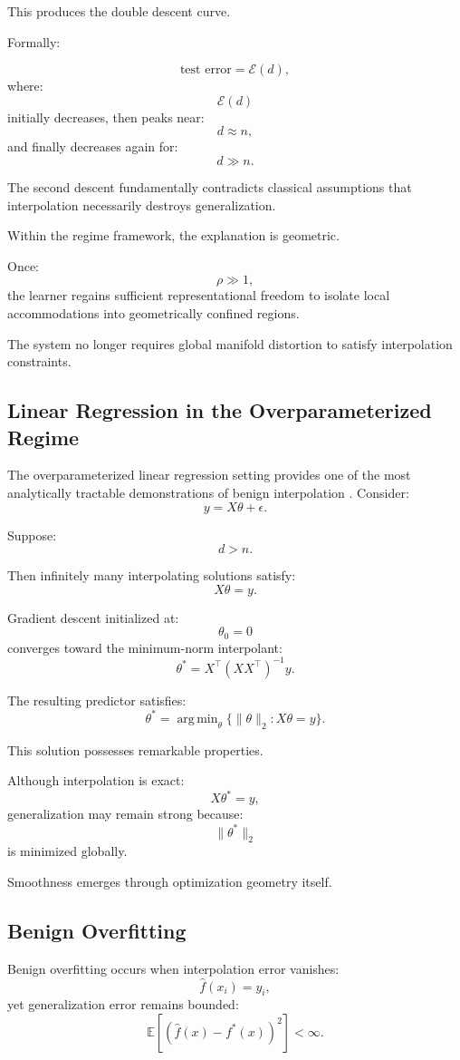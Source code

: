 \documentclass[12pt,a4paper]{article}
\DeclareMathOperator*{\argmin}{arg\,min}
\begin{document}
This produces the double descent curve.

Formally:

\[
\text{test error}
=
\mathcal{E}(d),
\]
where:
\[
\mathcal{E}(d)
\]
initially decreases,
then peaks near:
\[
d\approx n,
\]
and finally decreases again for:
\[
d\gg n.
\]

The second descent fundamentally contradicts classical assumptions that interpolation necessarily destroys generalization.

Within the regime framework, the explanation is geometric.

Once:
\[
\rho
\gg
1,
\]
the learner regains sufficient representational freedom to isolate local accommodations into geometrically confined regions.

The system no longer requires global manifold distortion to satisfy interpolation constraints.

\subsection{Linear Regression in the Overparameterized Regime}

The overparameterized linear regression setting provides one of the most analytically tractable demonstrations of benign interpolation \cite{Hastie2022}. Consider:
\[
y
=
X\theta
+
\epsilon.
\]

Suppose:
\[
d>n.
\]

Then infinitely many interpolating solutions satisfy:
\[
X\theta=y.
\]

Gradient descent initialized at:
\[
\theta_0=0
\]
converges toward the minimum-norm interpolant:
\[
\theta^\ast
=
X^\top
(XX^\top)^{-1}
y.
\]

The resulting predictor satisfies:
\[
\theta^\ast
=
\argmin_\theta
\{
\|\theta\|_2
:
X\theta=y
\}.
\]

This solution possesses remarkable properties.

Although interpolation is exact:
\[
X\theta^\ast=y,
\]
generalization may remain strong because:
\[
\|\theta^\ast\|_2
\]
is minimized globally.

Smoothness emerges through optimization geometry itself.

\subsection{Benign Overfitting}

Benign overfitting occurs when interpolation error vanishes:
\[
\hat{f}(x_i)=y_i,
\]
yet generalization error remains bounded:
\[
\mathbb{E}
[
(\hat{f}(x)-f^\ast(x))^2
]
<\infty.
\]
\end{document}
